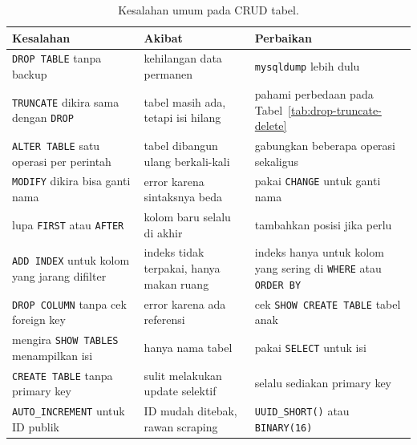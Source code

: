 \documentclass[11pt,a4paper]{article}
\begin{document}
\begin{table}[H]
	\centering
	\caption{Kesalahan umum pada CRUD tabel.}
	\label{tab:mistakes}
	\footnotesize
	\begin{tabularx}{\textwidth}{l X X}
		\toprule
		Kesalahan                                           & Akibat                                   & Perbaikan                                                                     \\
		\midrule
		\texttt{DROP TABLE} tanpa backup                    & kehilangan data permanen                 & \texttt{mysqldump} lebih dulu                                                 \\
		\texttt{TRUNCATE} dikira sama dengan \texttt{DROP}  & tabel masih ada, tetapi isi hilang       & pahami perbedaan pada Tabel~\ref{tab:drop-truncate-delete}                    \\
		\texttt{ALTER TABLE} satu operasi per perintah      & tabel dibangun ulang berkali-kali        & gabungkan beberapa operasi sekaligus                                          \\
		\texttt{MODIFY} dikira bisa ganti nama              & error karena sintaksnya beda             & pakai \texttt{CHANGE} untuk ganti nama                                        \\
		lupa \texttt{FIRST} atau \texttt{AFTER}             & kolom baru selalu di akhir               & tambahkan posisi jika perlu                                                   \\
		\texttt{ADD INDEX} untuk kolom yang jarang difilter & indeks tidak terpakai, hanya makan ruang & indeks hanya untuk kolom yang sering di \texttt{WHERE} atau \texttt{ORDER BY} \\
		\texttt{DROP COLUMN} tanpa cek foreign key          & error karena ada referensi               & cek \texttt{SHOW CREATE TABLE} tabel anak                                     \\
		mengira \texttt{SHOW TABLES} menampilkan isi        & hanya nama tabel                         & pakai \texttt{SELECT} untuk isi                                               \\
		\texttt{CREATE TABLE} tanpa primary key             & sulit melakukan update selektif          & selalu sediakan primary key                                                   \\
		\texttt{AUTO\_INCREMENT} untuk ID publik            & ID mudah ditebak, rawan scraping         & \texttt{UUID\_SHORT()} atau \texttt{BINARY(16)}                               \\
		\bottomrule
	\end{tabularx}
\end{table}
\end{document}
